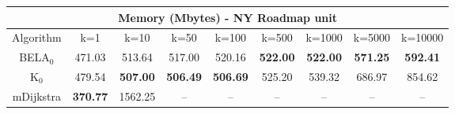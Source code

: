 \begin{tabular}{c|cccccccc}\toprule
\multicolumn{9}{c}{Memory (Mbytes) - NY Roadmap unit}\\ \midrule
Algorithm & k=1 & k=10 & k=50 & k=100 & k=500 & k=1000 & k=5000 & k=10000 \\ \midrule
BELA$_0$ & 471.03 & 513.64 & 517.00 & 520.16 & \textbf{522.00} & \textbf{522.00} & \textbf{571.25} & \textbf{592.41} \\
K$_0$ & 479.54 & \textbf{507.00} & \textbf{506.49} & \textbf{506.69} & 525.20 & 539.32 & 686.97 & 854.62 \\
mDijkstra & \textbf{370.77} & 1562.25 & -- & -- & -- & -- & -- & -- \\ \bottomrule 
\end{tabular}
